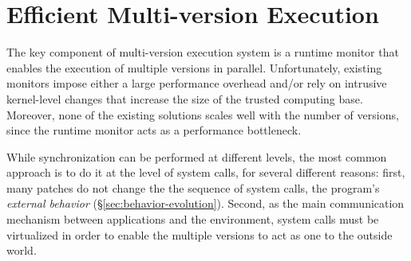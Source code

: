 \chapter{Efficient Multi-version Execution}

The key component of multi-version execution system is a runtime monitor that
enables the execution of multiple versions in parallel. Unfortunately, existing
monitors impose either a large performance overhead and/or rely on intrusive
kernel-level changes that increase the size of the trusted computing base.
Moreover, none of the existing solutions scales well with the number of
versions, since the runtime monitor acts as a performance bottleneck.

While synchronization can be performed at different levels, the most common
approach is to do it at the level of system calls, for several different
reasons:  first, many patches do not change the the sequence of system calls,
\ie the program's \textit{external behavior} (\S\ref{sec:behavior-evolution}).
Second, as the main communication mechanism between applications and the
environment, system calls must be virtualized in order to enable the multiple
versions to act as one to the outside world.




